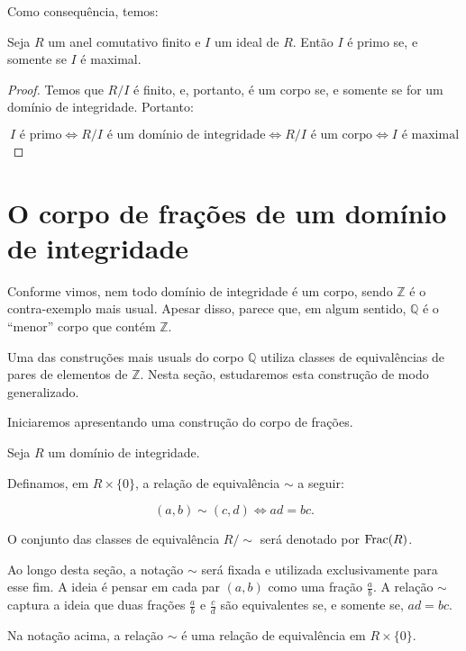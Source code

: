 Como consequência, temos:

\begin{corol}
    Seja $R$ um anel comutativo finito e $I$ um ideal de $R$. Então $I$ é primo se, e somente se $I$ é maximal.
\end{corol}
\begin{proof}
    Temos que $R/I$ é finito, e, portanto, é um corpo se, e somente se for um domínio de integridade.
    Portanto:

    \[I \text{ é primo} \Leftrightarrow R/I \text{ é um domínio de integridade} \Leftrightarrow R/I \text{ é um corpo} \Leftrightarrow I \text{ é maximal}\]
\end{proof}

\section{O corpo de frações de um domínio de integridade}

Conforme vimos, nem todo domínio de integridade é um corpo, sendo $\mathbb Z$ é o contra-exemplo mais usual.
Apesar disso, parece que, em algum sentido, $\mathbb Q$ é o ``menor'' corpo que contém $\mathbb Z$.

Uma das construções mais usuals do corpo $\mathbb Q$ utiliza classes de equivalências de pares de elementos de $\mathbb Z$.
Nesta seção, estudaremos esta construção de modo generalizado.

Iniciaremos apresentando uma construção do corpo de frações.

\begin{definition}
    Seja $R$ um domínio de integridade.

    Definamos, em $R\times \{0\}$, a relação de equivalência $\sim$ a seguir:

    \[(a, b) \sim (c, d) \Leftrightarrow ad=bc.\]

    O conjunto das classes de equivalência $R/\sim$ será denotado por $\operatorname{Frac}(R)$.
\end{definition}

Ao longo desta seção, a notação $\sim$ será fixada e utilizada exclusivamente para esse fim.
A ideia é pensar em cada par $(a, b)$ como uma fração $\frac{a}{b}$.
A relação $\sim$ captura a ideia que duas frações $\frac{a}{b}$ e $\frac{c}{d}$ são equivalentes se, e somente se, $ad=bc$.

\begin{lemma}
    Na notação acima, a relação $\sim$ é uma relação de equivalência em $R\times \{0\}$.
\end{lemma}

